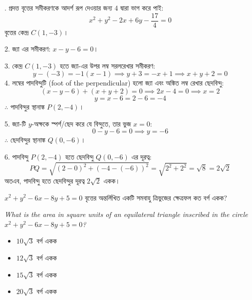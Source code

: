 \documentclass[12pt, a4paper]{article}
\begin{document}
\begin{tcolorbox}[solutionbox={সমাধান (Solution)}]
    . প্রদত্ত বৃত্তের সমীকরণকে আদর্শ রূপ দেওয়ার জন্য $4$ দ্বারা ভাগ করে পাই:
    \[ x^2 + y^2 - 2x + 6y - \frac{17}{4} = 0 \]
    বৃত্তের কেন্দ্র $C(1, -3)$।
    
    \vspace{0.5em}
    2. জ্যা এর সমীকরণ: $x - y - 6 = 0$।
    
    3. কেন্দ্র $C(1, -3)$ হতে জ্যা-এর উপর লম্ব সরলরেখার সমীকরণ:
    \[ y - (-3) = -1(x - 1) \implies y + 3 = -x + 1 \implies x + y + 2 = 0 \]
    4. লম্বের পাদবিন্দুটি (foot of the perpendicular) হলো জ্যা এবং অঙ্কিত লম্ব রেখার ছেদবিন্দু:
    \[ (x - y - 6) + (x + y + 2) = 0 \implies 2x - 4 = 0 \implies x = 2 \]
    \[ y = x - 6 = 2 - 6 = -4 \]
    $\therefore$ পাদবিন্দুর স্থানাঙ্ক $P(2, -4)$।
    
    \vspace{0.5em}
    5. জ্যা-টি $y$-অক্ষকে স্পর্শ/ছেদ করে যে বিন্দুতে, তার ভুজ $x = 0$:
    \[ 0 - y - 6 = 0 \implies y = -6 \]
    $\therefore$ ছেদবিন্দুর স্থানাঙ্ক $Q(0, -6)$।
    
    6. পাদবিন্দু $P(2, -4)$ হতে ছেদবিন্দু $Q(0, -6)$ এর দূরত্ব:
    \[ PQ = \sqrt{(2 - 0)^2 + (-4 - (-6))^2} = \sqrt{2^2 + 2^2} = \sqrt{8} = 2\sqrt{2} \]
    অতএব, পাদবিন্দু হতে ছেদবিন্দুর দূরত্ব $2\sqrt{2}$ একক।
\end{tcolorbox}

\begin{tcolorbox}[questionbox={প্রশ্ন (Question) 17}]
    \noindent
    $x^2 + y^2 - 6x - 8y + 5 = 0$ বৃত্তের অন্তর্লিখিত একটি সমবাহু ত্রিভুজের ক্ষেত্রফল কত বর্গ একক?
    
    \vspace{0.8em}
    \begin{english}
    \noindent\textit{\color{darkgray}
    What is the area in square units of an equilateral triangle inscribed in the circle $x^2 + y^2 - 6x - 8y + 5 = 0$?
    }
    \end{english}
\end{tcolorbox}

\begin{itemize}[label={}, leftmargin=1cm, itemsep=0.5em]
    \item[\textbf{A)}] $10\sqrt{3}$ বর্গ একক
    \item[\textbf{B)}] $12\sqrt{3}$ বর্গ একক
    \item[\textbf{C)}] $15\sqrt{3}$ বর্গ একক
    \item[\textbf{D)}] $20\sqrt{3}$ বর্গ একক
\end{itemize}
\end{document}
